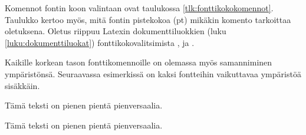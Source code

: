 Komennot fontin koon valintaan ovat taulukossa
\ref{tlk:fonttikokokomennot}. Taulukko kertoo myös, mitä fontin
pistekokoa (pt) mikäkin komento tarkoittaa oletuksena. Oletus riippuu
Latexin dokumenttiluokkien (luku \ref{luku:dokumenttiluokat})
fonttikokovalitsimista \koodi{10pt}, \koodi{11pt} ja \koodi{12pt}.


\pagebreak[3]

Kaikille korkean tason fonttikomennoille on olemassa myös samanniminen
ympäristönsä. Seuraavassa esimerkissä on kaksi fontteihin vaikuttavaa
ympäristöä sisäkkäin.

\pagebreak[3]

\begin{koodilohkosis}
  \begin{footnotesize}
    \begin{scshape}
      Tämä teksti on pienen pientä pienversaalia.
    \end{scshape}
  \end{footnotesize}
\end{koodilohkosis}

\begin{tulossis}
  \begin{footnotesize}
    \begin{scshape}
      Tämä teksti on pienen pientä pienversaalia.
    \end{scshape}
  \end{footnotesize}
\end{tulossis}

